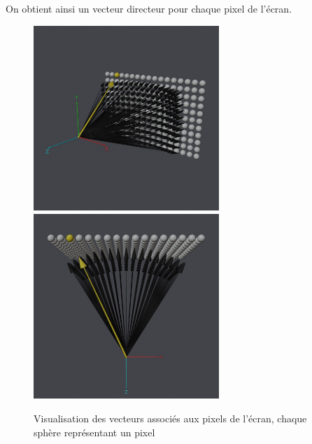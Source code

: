 On obtient ainsi un vecteur directeur pour chaque pixel de l'écran.
\begin{figure}[h]
    \centering
    \includegraphics[width=7cm]{images/vectorscreen1.jpg}
    \includegraphics[width=7cm]{images/vectorscreen2.jpg}
    \caption{Visualisation des vecteurs associés aux pixels de l'écran, chaque sphère représentant un pixel }
    \label{fig:screenvectors}
\end{figure}